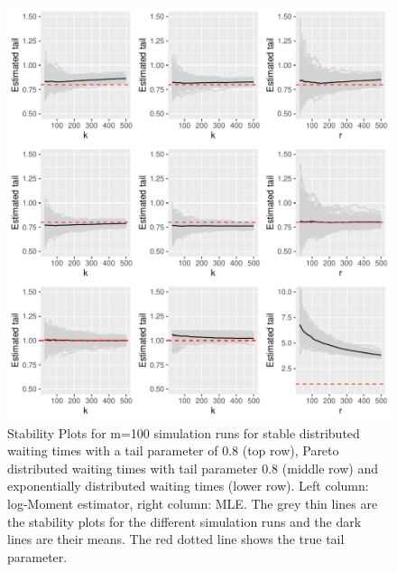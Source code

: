 \documentclass[]{elsarticle} %
\begin{document}
\begin{figure}

{\centering \includegraphics[width=1\linewidth]{article_springer_files/figure-latex/TailSimuplots-1} 

}

\caption{\label{Fig:TailSimu} Stability Plots for m=100 simulation runs for stable distributed waiting times with a tail parameter of 0.8 (top row), Pareto distributed waiting times with tail parameter 0.8 (middle row) and exponentially distributed waiting times (lower row). Left column: log-Moment estimator, right column: MLE. The grey thin lines are the stability plots for the different simulation runs and the dark lines are their means. The red dotted line shows the true tail parameter.}\label{fig:TailSimuplots}
\end{figure}
\end{document}
